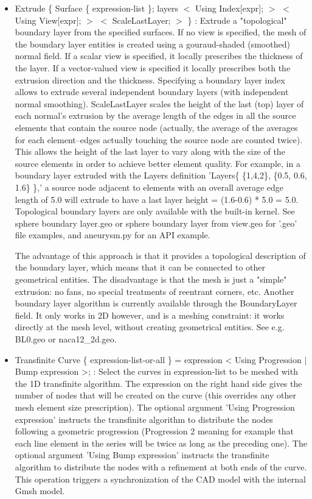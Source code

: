 \documentclass[dvipdfmx, 9pt, a4paper]{article}
\numberwithin{equation}{section}
\begin{document}
\begin{itemize}
\item Extrude \{ Surface \{ expression-list \}; layers $<$ Using Index[expr]; $>$ $<$ Using View[expr]; $>$ $<$ ScaleLastLayer; $>$ \} : Extrude a "topological" boundary layer from the specified surfaces. If no view is specified, the mesh of the boundary layer entities is created using a gouraud-shaded (smoothed) normal field. If a scalar view is specified, it locally prescribes the thickness of the layer. If a vector-valued view is specified it locally prescribes both the extrusion direction and the thickness. Specifying a boundary layer index allows to extrude several independent boundary layers (with independent normal smoothing). ScaleLastLayer scales the height of the last (top) layer of each normal's extrusion by the average length of the edges in all the source elements that contain the source node (actually, the average of the averages for each element–edges actually touching the source node are counted twice). This allows the height of the last layer to vary along with the size of the source elements in order to achieve better element quality. For example, in a boundary layer extruded with the Layers definition 'Layers\{ \{1,4,2\}, \{0.5, 0.6, 1.6\} \},' a source node adjacent to elements with an overall
average edge length of 5.0 will extrude to have a last layer height = (1.6-0.6) * 5.0 = 5.0. Topological boundary layers are only available with the built-in kernel. See sphere boundary layer.geo or sphere boundary layer from view.geo for '.geo' file examples, and aneurysm.py for an API example.\par
The advantage of this approach is that it provides a topological description of the boundary layer, which means that it can be connected to other geometrical entities. The disadvantage is that the mesh is just a "simple" extrusion: no fans, no special treatments of reentrant corners, etc. Another boundary layer algorithm is currently available through the BoundaryLayer field. It only works in 2D however, and is a meshing constraint: it works directly at the mesh level, without creating geometrical entities. See e.g. BL0.geo or naca12\_2d.geo.
\item Transfinite Curve \{ expression-list-or-all \} = expression < Using Progression $|$ Bump expression >; : Select the curves in expression-list to be meshed with the 1D transfinite algorithm. The expression on the right hand side gives the number of nodes that will be created on the curve (this overrides any other mesh element size prescription). The optional argument 'Using Progression expression' instructs the transfinite algorithm to distribute the nodes following a geometric progression (Progression 2 meaning for example that each line element in the series will be twice as long as the preceding one). The optional argument 'Using Bump expression' instructs the transfinite algorithm to distribute the nodes with a refinement at both ends of the curve. This operation triggers a synchronization of the CAD model with the internal Gmsh model.

\end{itemize}
\end{document}

